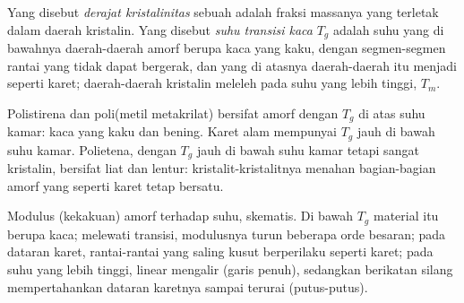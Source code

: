 \begin{definition}\label{def:b2:polymer-synthesis:transitions}
Yang disebut \emph{derajat kristalinitas}
sebuah  adalah fraksi massanya yang terletak dalam daerah kristalin.
Yang disebut \emph{suhu transisi kaca}
$T_g$ adalah suhu yang di bawahnya daerah-daerah amorf berupa kaca yang
kaku, dengan segmen-segmen rantai yang tidak dapat bergerak, dan yang di
atasnya daerah-daerah itu menjadi seperti karet; daerah-daerah kristalin
meleleh pada suhu yang lebih tinggi, $T_m$.
\end{definition}

Polistirena dan poli(metil metakrilat) bersifat amorf dengan $T_g$ di atas
suhu kamar: kaca yang kaku dan bening. Karet alam mempunyai $T_g$ jauh di
bawah suhu kamar. Polietena, dengan $T_g$ jauh di bawah suhu kamar tetapi
sangat kristalin, bersifat liat dan lentur: kristalit-kristalitnya menahan
bagian-bagian amorf yang seperti karet tetap bersatu.

\begin{omfigure}
\par\vspace{4pt}

{\small Modulus (kekakuan)  amorf terhadap suhu, skematis. Di bawah
$T_g$ material itu berupa kaca; melewati transisi, modulusnya turun beberapa
orde besaran; pada dataran karet, rantai-rantai yang saling kusut berperilaku
seperti karet; pada suhu yang lebih tinggi,  linear mengalir (garis
penuh), sedangkan  berikatan silang mempertahankan dataran karetnya
sampai terurai (putus-putus).}
\end{omfigure}

